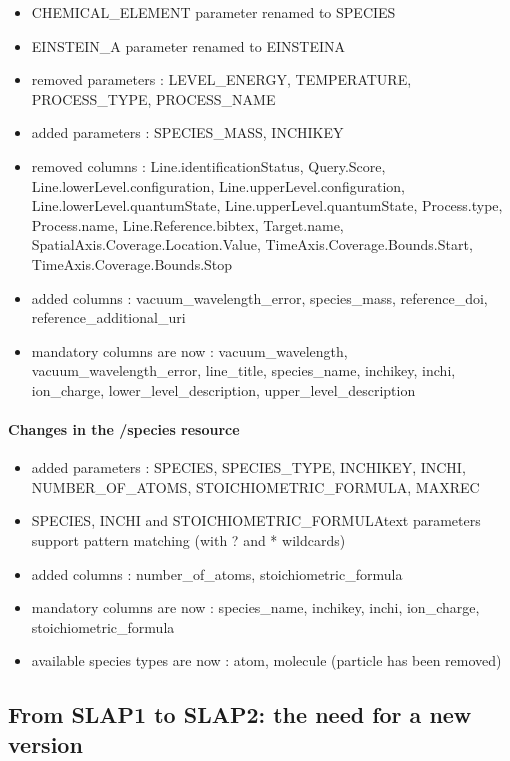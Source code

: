 \documentclass[11pt,a4paper]{ivoa}
\begin{document}
\begin{itemize}
\item CHEMICAL\_ELEMENT parameter renamed to SPECIES
\item EINSTEIN\_A parameter renamed to EINSTEINA
\item removed parameters : LEVEL\_ENERGY, TEMPERATURE, PROCESS\_TYPE, PROCESS\_NAME
\item added parameters : SPECIES\_MASS, INCHIKEY
\item removed columns : Line.identificationStatus, Query.Score, Line.lowerLevel.configuration, Line.upperLevel.configuration,
Line.lowerLevel.quantumState, Line.upperLevel.quantumState, Process.type, Process.name, Line.Reference.bibtex, Target.name, 
SpatialAxis.Coverage.Location.Value, TimeAxis.Coverage.Bounds.Start, TimeAxis.Coverage.Bounds.Stop
\item added columns : vacuum\_wavelength\_error, species\_mass, reference\_doi, reference\_additional\_uri
\item mandatory columns are now : vacuum\_wavelength, vacuum\_wavelength\_error, line\_title, species\_name, 
inchikey, inchi, ion\_charge, lower\_level\_description, upper\_level\_description
\end{itemize}

\paragraph{Changes in the /species resource}
\begin{itemize}
\item added parameters : SPECIES, SPECIES\_TYPE, INCHIKEY, INCHI, NUMBER\_OF\_ATOMS, STOICHIOMETRIC\_FORMULA, MAXREC
\item SPECIES, INCHI and STOICHIOMETRIC\_FORMULAtext parameters support pattern matching (with ? and * wildcards)
\item added columns : number\_of\_atoms, stoichiometric\_formula
\item mandatory columns are now : species\_name, inchikey, inchi, ion\_charge, stoichiometric\_formula
\item available species types are now : atom, molecule (particle has been removed)
\end{itemize}

\subsection{From SLAP1 to SLAP2: the need for a new version}
\end{document}
